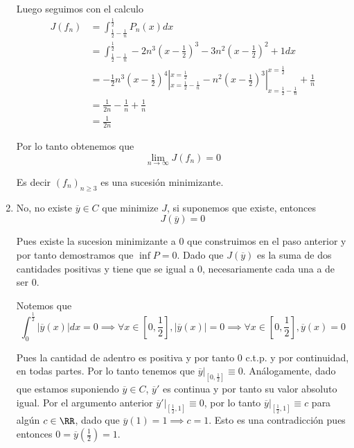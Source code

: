 \documentclass[a4paper,oneside,10.5pt]{USMArt}
\begin{document}
\begin{sol}
\begin{enumerate}
          Luego seguimos con el calculo
          \begin{align*}
            J(f_{n}) &= \int_{\frac12 - \frac1n}^{\frac12} P_{n}(x) dx\\
                     &= \int_{\frac12 - \frac1n}^{\frac12} -2n^{3}(x - \frac12)^{3} - 3n^{2}(x - \frac12)^{2} + 1 dx\\
                     &= -\frac{1}{2}n^{3}(x - \frac12)^{4}|_{x = \frac12 - \frac1n}^{x = \frac12} - n^{2}(x - \frac12)^{3}|_{x = \frac12 - \frac1n}^{x = \frac12} + \frac1n\\
                     &= \frac{1}{2n} - \frac{1}{n} + \frac{1}{n}\\
                     &= \frac{1}{2n}
          \end{align*}

          Por lo tanto obtenemos que
          \begin{equation*}
            \lim_{n \to \infty} J(f_{n}) = 0
          \end{equation*}

          Es decir $(f_{n})_{n \geq 3}$ es una sucesión minimizante.

    \item No, no existe $\overline{y} \in C$ que minimize $J$, si suponemos que existe, entonces
    \begin{equation*}
      J(\overline{y}) = 0
    \end{equation*}

          Pues existe la sucesion minimizante a $0$ que construimos en el paso anterior y por tanto demostramos que $\inf P = 0$. Dado que $J(\overline{y})$ es la suma de dos cantidades positivas y tiene que se igual a $0$, necesariamente cada una a de ser $0$.

          Notemos que
          \begin{equation*}
            \int_{0}^{\frac12} |\overline{y}(x)| dx = 0 \implies \forall x \in [0, \frac12], |\overline{y}(x)| = 0 \implies \forall x \in [0, \frac12], \overline{y}(x) = 0
          \end{equation*}

          Pues la cantidad de adentro es positiva y por tanto $0$ c.t.p. y por continuidad, en todas partes. Por lo tanto tenemos que $\overline{y}|_{[0, \frac12]} \equiv 0$. Análogamente, dado que estamos suponiendo $\overline{y} \in C$, $\overline{y}'$ es continua y por tanto su valor absoluto igual. Por el argumento anterior $\overline{y}'|_{[\frac12, 1]} \equiv 0$, por lo tanto $\overline{y}|_{[\frac12, 1]} \equiv c$ para algún $c \in \RR$, dado que $\overline{y}(1) = 1 \implies c = 1$. Esto es una contradicción pues entonces $0 = \overline{y}(\frac12) = 1$.
  \end{enumerate}
\end{sol}
\end{document}

